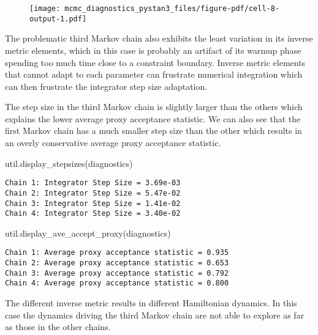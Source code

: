 \documentclass[
  letterpaper,
  DIV=11,
  numbers=noendperiod]{scrartcl}
\newenvironment{Shaded}{\begin{snugshade}}{\end{snugshade}}
\newcommand{\NormalTok}[1]{\textcolor[rgb]{0.00,0.23,0.31}{#1}}
\begin{document}
\begin{figure}[H]

{\centering \texttt{[image: mcmc\_diagnostics\_pystan3\_files/figure-pdf/cell-8-output-1.pdf]}

}

\end{figure}

The problematic third Markov chain also exhibits the least variation in
its inverse metric elements, which in this case is probably an artifact
of its warmup phase spending too much time close to a constraint
boundary. Inverse metric elements that cannot adapt to each parameter
can frustrate numerical integration which can then frustrate the
integrator step size adaptation.

The step size in the third Markov chain is slightly larger than the
others which explains the lower average proxy acceptance statistic. We
can also see that the first Markov chain has a much smaller step size
than the other which results in an overly conservative average proxy
acceptance statistic.

\begin{Shaded}
\begin{Highlighting}[]
\NormalTok{util.display\_stepsizes(diagnostics)}
\end{Highlighting}
\end{Shaded}

\begin{verbatim}
Chain 1: Integrator Step Size = 3.69e-03
Chain 2: Integrator Step Size = 5.47e-02
Chain 3: Integrator Step Size = 1.41e-02
Chain 4: Integrator Step Size = 3.40e-02
\end{verbatim}

\begin{Shaded}
\begin{Highlighting}[]
\NormalTok{util.display\_ave\_accept\_proxy(diagnostics)}
\end{Highlighting}
\end{Shaded}

\begin{verbatim}
Chain 1: Average proxy acceptance statistic = 0.935
Chain 2: Average proxy acceptance statistic = 0.653
Chain 3: Average proxy acceptance statistic = 0.792
Chain 4: Average proxy acceptance statistic = 0.800
\end{verbatim}

The different inverse metric results in different Hamiltonian dynamics.
In this case the dynamics driving the third Markov chain are not able to
explore as far as those in the other chains.
\end{document}

